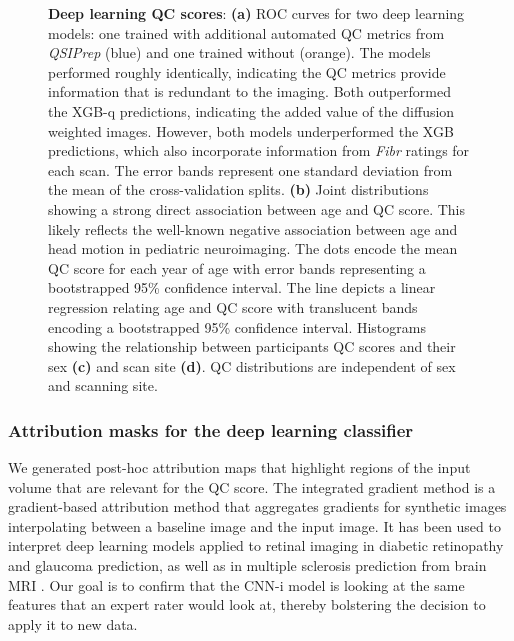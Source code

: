 \documentclass[9pt,lineno]{elife}
\begin{document}
\begin{figure}[tbp]
\begin{subfigure}{\linewidth}
    \end{subfigure}
    \caption{%
        {\bf Deep learning QC scores}:
        \textbf{(a)} ROC curves for two deep learning models: one trained with
        additional automated QC metrics from \emph{QSIPrep} (blue) and one
        trained without (orange). The models performed roughly identically,
        indicating the QC metrics provide information that is redundant to
        the imaging. Both outperformed the XGB-q predictions, indicating the
        added value of the diffusion weighted images. However, both models
        underperformed the XGB predictions, which also incorporate
        information from \emph{Fibr} ratings for each scan. The error bands
        represent one standard deviation from the mean of the cross-validation
        splits.
        \textbf{(b)} Joint distributions showing a strong direct association
        between age and QC score. This likely reflects the well-known negative
        association between age and head motion in pediatric neuroimaging.
        The dots encode the mean QC score for each year of age with error bands
        representing a bootstrapped 95\% confidence interval. The line depicts
        a linear regression relating age and QC score with translucent bands
        encoding a bootstrapped 95\% confidence interval.
        Histograms showing the relationship between participants QC scores and
        their sex \textbf{(c)} and scan site \textbf{(d)}. QC distributions are independent
        of sex and scanning site.
    }
    \label{fig:dl-qc}
\end{figure}

\subsubsection{Attribution masks for the deep learning classifier}

We generated post-hoc attribution maps that highlight regions of the input
volume that are relevant for the QC score. The integrated gradient method
\citep{sundararajan2017axiomatic} is a gradient-based attribution method
\citep{ancona2019gradient} that aggregates gradients for synthetic images
interpolating between a baseline image and the input image. It has been used to
interpret deep learning models applied to retinal imaging in diabetic
retinopathy \citep{sayres2019using} and glaucoma \citep{Mehta2021-zp} prediction,
as well as in multiple sclerosis prediction from brain MRI
\citep{wargnier-dauchelle2021interpretable}. Our goal is to confirm that the
CNN-i model is looking at the same features that an expert rater would look at,
thereby bolstering the decision to apply it to new data.
\end{document}
